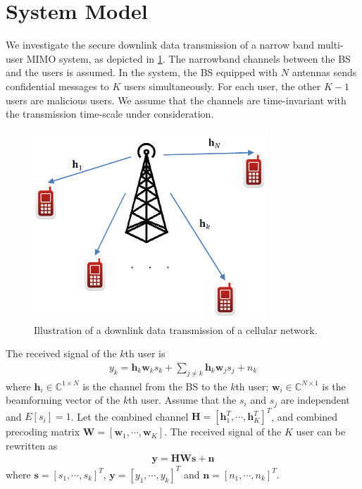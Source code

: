 \documentclass[12pt,journal,draftclsnofoot,onecolumn]{IEEEtran}
\begin{document}
\section{System Model} \label{sec:system model}
We investigate the secure downlink data transmission of a narrow band multi-user MIMO system, as depicted in \ref{fig:system}. The narrowband channels
between the BS and the users is assumed. In the system, the BS equipped with $N$ antennas sends confidential messages to $K$ users simultaneously. 
For each user, the other $K - 1$ users are malicious users. 
We assume that the
channels are time-invariant with the transmission time-scale
under consideration. 
\begin{figure}[!htbp]
	\centering
	\includegraphics[width=8.7cm]{system.png} %
	\caption{Illustration of a downlink data transmission of a cellular network.}
	\label{fig:system}
\end{figure}

The received signal of the $k$th user is 
\begin{eqnarray}
y_k = \mathbf{h}_{k}\mathbf{w}_{k}s_k + \sum_{j \neq k}\mathbf{h}_k\mathbf{w}_js_j + n_k
\end{eqnarray}
where $\mathbf{h}_i \in \mathbb{C}^{1 \times N}$ is the channel from the BS to the $k$th user; $\mathbf{w}_i \in \mathbb{C}^{N \times 1}$ is the beamforming vector of the $k$th user. Assume that the $s_i$ and $s_j$ are independent and $E[s_i] = 1$. Let the combined channel $\mathbf{H} = [\mathbf{h}_1^T,\cdots,\mathbf{h}_K^T]^T$, and combined precoding matrix $\mathbf{W} = [\mathbf{w}_1,\cdots,\mathbf{w}_K]$. The received signal of the $K$ user can be rewritten as
\begin{eqnarray}
\mathbf{y} = \mathbf{H}\mathbf{W}\mathbf{s} + \mathbf{n}
\end{eqnarray}
where $\mathbf{s} = [s_1,\cdots,s_k]^T$, $\mathbf{y} = [y_1,\cdots,y_k]^T$ and $\mathbf{n} = [n_1,\cdots,n_k]^T$.
\end{document}
